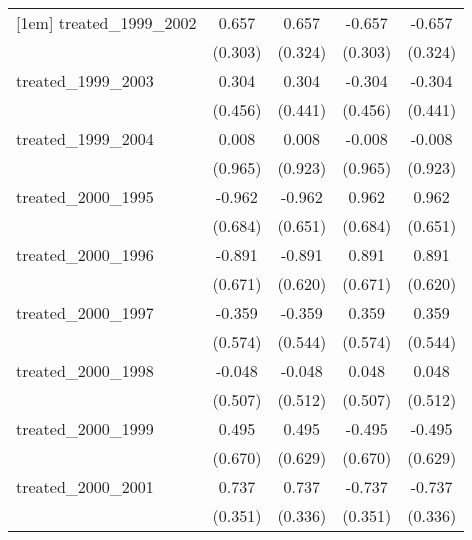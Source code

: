 {\begin{tabular}{l*{4}{c}}
[1em]
treated\_1999\_2002&       0.657\sym{*}  &       0.657\sym{*}  &      -0.657\sym{*}  &      -0.657\sym{*}  \\
            &     (0.303)         &     (0.324)         &     (0.303)         &     (0.324)         \\
[1em]
treated\_1999\_2003&       0.304         &       0.304         &      -0.304         &      -0.304         \\
            &     (0.456)         &     (0.441)         &     (0.456)         &     (0.441)         \\
[1em]
treated\_1999\_2004&       0.008         &       0.008         &      -0.008         &      -0.008         \\
            &     (0.965)         &     (0.923)         &     (0.965)         &     (0.923)         \\
[1em]
treated\_2000\_1995&      -0.962         &      -0.962         &       0.962         &       0.962         \\
            &     (0.684)         &     (0.651)         &     (0.684)         &     (0.651)         \\
[1em]
treated\_2000\_1996&      -0.891         &      -0.891         &       0.891         &       0.891         \\
            &     (0.671)         &     (0.620)         &     (0.671)         &     (0.620)         \\
[1em]
treated\_2000\_1997&      -0.359         &      -0.359         &       0.359         &       0.359         \\
            &     (0.574)         &     (0.544)         &     (0.574)         &     (0.544)         \\
[1em]
treated\_2000\_1998&      -0.048         &      -0.048         &       0.048         &       0.048         \\
            &     (0.507)         &     (0.512)         &     (0.507)         &     (0.512)         \\
[1em]
treated\_2000\_1999&       0.495         &       0.495         &      -0.495         &      -0.495         \\
            &     (0.670)         &     (0.629)         &     (0.670)         &     (0.629)         \\
[1em]
treated\_2000\_2001&       0.737\sym{*}  &       0.737\sym{*}  &      -0.737\sym{*}  &      -0.737\sym{*}  \\
            &     (0.351)         &     (0.336)         &     (0.351)         &     (0.336)         \\

\end{tabular}}
